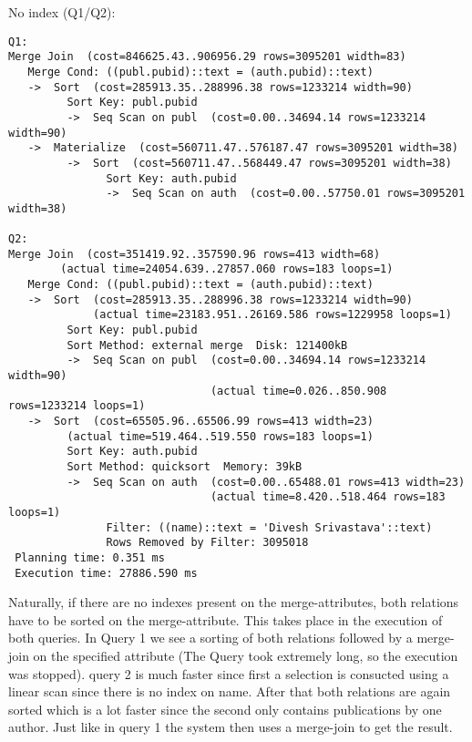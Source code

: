 \documentclass[11pt]{scrartcl}
\begin{document}
\noindent No index (Q1/Q2):
{\small
\begin{verbatim}
Q1:
Merge Join  (cost=846625.43..906956.29 rows=3095201 width=83)
   Merge Cond: ((publ.pubid)::text = (auth.pubid)::text)
   ->  Sort  (cost=285913.35..288996.38 rows=1233214 width=90)
         Sort Key: publ.pubid
         ->  Seq Scan on publ  (cost=0.00..34694.14 rows=1233214 width=90)
   ->  Materialize  (cost=560711.47..576187.47 rows=3095201 width=38)
         ->  Sort  (cost=560711.47..568449.47 rows=3095201 width=38)
               Sort Key: auth.pubid
               ->  Seq Scan on auth  (cost=0.00..57750.01 rows=3095201 width=38)

Q2:
Merge Join  (cost=351419.92..357590.96 rows=413 width=68)
	    (actual time=24054.639..27857.060 rows=183 loops=1)
   Merge Cond: ((publ.pubid)::text = (auth.pubid)::text)
   ->  Sort  (cost=285913.35..288996.38 rows=1233214 width=90)
             (actual time=23183.951..26169.586 rows=1229958 loops=1)
         Sort Key: publ.pubid
         Sort Method: external merge  Disk: 121400kB
         ->  Seq Scan on publ  (cost=0.00..34694.14 rows=1233214 width=90)
                               (actual time=0.026..850.908 rows=1233214 loops=1)
   ->  Sort  (cost=65505.96..65506.99 rows=413 width=23)
	     (actual time=519.464..519.550 rows=183 loops=1)
         Sort Key: auth.pubid
         Sort Method: quicksort  Memory: 39kB
         ->  Seq Scan on auth  (cost=0.00..65488.01 rows=413 width=23)
                               (actual time=8.420..518.464 rows=183 loops=1)
               Filter: ((name)::text = 'Divesh Srivastava'::text)
               Rows Removed by Filter: 3095018
 Planning time: 0.351 ms
 Execution time: 27886.590 ms
\end{verbatim}
Naturally, if there are no indexes present on the merge-attributes, both relations have to be sorted on the merge-attribute. This takes place in the execution of both queries.
In Query 1 we see a sorting of both relations followed by a merge-join on the specified attribute (The Query took extremely long, so the execution was stopped).
query 2 is much faster since first a selection is consucted using a linear scan since there is no index on name. After that both relations are again sorted which is a lot faster
since the second only contains publications by one author. Just like in query 1 the system then uses a merge-join to get the result.
}
\end{document}
